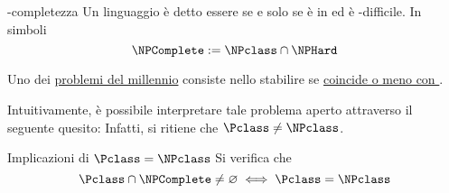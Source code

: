 \documentclass[a4paper, 12pt]{report}
\begin{document}
    \begin{frameddefn}[label={np completeness def}]{\NPclass-completezza}
        Un linguaggio è detto essere  se e solo se è in \NPclass ed è \NPclass-difficile. In simboli $$\NPComplete := \NPclass \cap \NPHard$$
    \end{frameddefn}

    \begin{framedobs}{}
        Uno dei \href{https://en.wikipedia.org/wiki/Millennium_Prize_Problems#P_versus_NP}{problemi del millennio} consiste nello stabilire se \href{https://en.wikipedia.org/wiki/P_versus_NP_problem}{\Pclass coincide o meno con \NPclass}.
        
        Intuitivamente, è possibile interpretare tale problema aperto attraverso il seguente quesito:  Infatti, si ritiene che $\Pclass \neq \NPclass$.
    \end{framedobs}

    \begin{framedprop}[label={p = np impl 3}]{Implicazioni di $\Pclass = \NPclass$}
        Si verifica che $$\Pclass \cap \NPComplete \neq \varnothing \iff \Pclass = \NPclass$$
    \end{framedprop}

\end{document}
